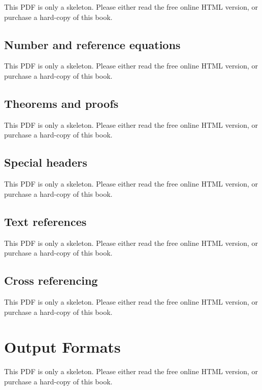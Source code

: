 \documentclass[
  11pt,
]{krantz}
\theoremstyle{definition}
\theoremstyle{definition}
\theoremstyle{definition}
\theoremstyle{definition}
\theoremstyle{remark}
\begin{document}
This PDF is only a skeleton. Please either read the free online HTML version, or purchase a hard-copy of this book.

\subsection{Number and reference equations}\label{equations}

This PDF is only a skeleton. Please either read the free online HTML version, or purchase a hard-copy of this book.

\subsection{Theorems and proofs}\label{theorems}

This PDF is only a skeleton. Please either read the free online HTML version, or purchase a hard-copy of this book.

\subsection{Special headers}\label{special-headers}

This PDF is only a skeleton. Please either read the free online HTML version, or purchase a hard-copy of this book.

\subsection{Text references}\label{text-references}

This PDF is only a skeleton. Please either read the free online HTML version, or purchase a hard-copy of this book.

\subsection{Cross referencing}\label{cross-referencing}

This PDF is only a skeleton. Please either read the free online HTML version, or purchase a hard-copy of this book.

\section{Output Formats}\label{bookdown-output}

This PDF is only a skeleton. Please either read the free online HTML version, or purchase a hard-copy of this book.
\end{document}
